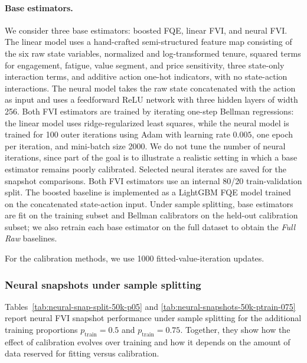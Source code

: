 \documentclass{article}
\theoremstyle{plain}
\theoremstyle{definition}
\theoremstyle{remark}
\begin{document}
\paragraph{Base estimators.}
We consider three base estimators: boosted FQE, linear FVI, and neural FVI.
The linear model uses a hand-crafted semi-structured feature map consisting of
the six raw state variables, normalized and log-transformed tenure, squared
terms for engagement, fatigue, value segment, and price sensitivity, three
state-only interaction terms, and additive action one-hot indicators, with no
state-action interactions. The neural model takes the raw state concatenated
with the action as input and uses a feedforward ReLU network with three hidden
layers of width 256. Both FVI estimators are trained by iterating one-step
Bellman regressions: the linear model uses ridge-regularized least squares,
while the neural model is trained for 100 outer iterations using Adam with
learning rate \(0.005\), one epoch per iteration, and mini-batch size 2000.
We do not tune the number of neural iterations, since part of the goal is to
illustrate a realistic setting in which a base estimator remains poorly
calibrated. Selected neural iterates are saved for the snapshot comparisons.
Both FVI estimators use an internal 80/20 train-validation split. The boosted
baseline is implemented as a LightGBM FQE model trained on the concatenated
state-action input. Under sample splitting, base estimators are fit on the
training subset and Bellman calibrators on the held-out calibration subset; we
also retrain each base estimator on the full dataset to obtain the
\emph{Full Raw} baselines. 



For the calibration methods, we use 1000 fitted-value-iteration updates.


 

 \subsubsection{Neural snapshots under sample splitting}

Tables~\ref{tab:neural-snap-split-50k-p05} and \ref{tab:neural-snapshots-50k-ptrain-075} report neural FVI snapshot performance under sample splitting for the additional training proportions \(p_{\mathrm{train}}=0.5\) and \(p_{\mathrm{train}}=0.75\). Together, they show how the effect of calibration evolves over training and how it depends on the amount of data reserved for fitting versus calibration.
\end{document}

